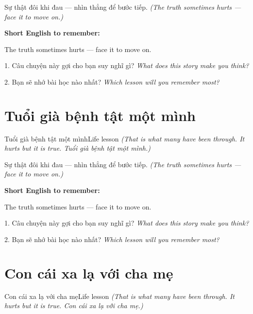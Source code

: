 \begin{baihoc}
Sự thật đôi khi đau — nhìn thẳng để bước tiếp.
\textit{(The truth sometimes hurts — face it to move on.)}
\end{baihoc}

\begin{ghinhoanh}
\textbf{Short English to remember:}

The truth sometimes hurts — face it to move on.

\end{ghinhoanh}

\begin{tuhocnhanh}
1. Câu chuyện này gợi cho bạn suy nghĩ gì? \textit{What does this story make you think?}

2. Bạn sẽ nhớ bài học nào nhất? \textit{Which lesson will you remember most?}
\end{tuhocnhanh}
\ngancach


\section{Tuổi già bệnh tật một mình}
\begin{truyen}{Tuổi già bệnh tật một mình}{Life lesson}
\textit{(That is what many have been through. It hurts but it is true. Tuổi già bệnh tật một mình.)}
\end{truyen}

\begin{baihoc}
Sự thật đôi khi đau — nhìn thẳng để bước tiếp.
\textit{(The truth sometimes hurts — face it to move on.)}
\end{baihoc}

\begin{ghinhoanh}
\textbf{Short English to remember:}

The truth sometimes hurts — face it to move on.

\end{ghinhoanh}

\begin{tuhocnhanh}
1. Câu chuyện này gợi cho bạn suy nghĩ gì? \textit{What does this story make you think?}

2. Bạn sẽ nhớ bài học nào nhất? \textit{Which lesson will you remember most?}
\end{tuhocnhanh}
\ngancach


\section{Con cái xa lạ với cha mẹ}
\begin{truyen}{Con cái xa lạ với cha mẹ}{Life lesson}
\textit{(That is what many have been through. It hurts but it is true. Con cái xa lạ với cha mẹ.)}
\end{truyen}

